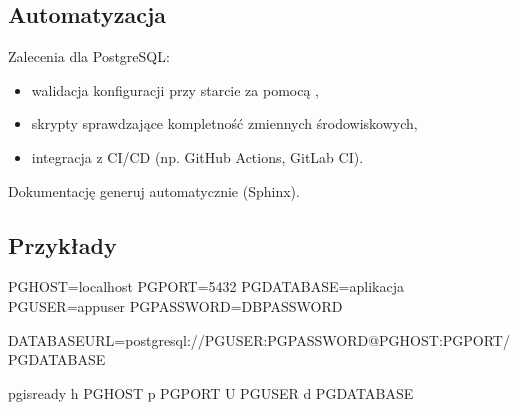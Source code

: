 \documentclass[a4paper,11pt,english,openany,oneside]{sphinxmanual}
\begin{document}
\subsection{Automatyzacja}
\label{\detokenize{rozdzial_2/rozdzial_22/index:automatyzacja}}
\sphinxAtStartPar
Zalecenia dla PostgreSQL:
\begin{itemize}
\item {} 
\sphinxAtStartPar
walidacja konfiguracji przy starcie za pomocą ,

\item {} 
\sphinxAtStartPar
skrypty sprawdzające kompletność zmiennych środowiskowych,

\item {} 
\sphinxAtStartPar
integracja z CI/CD (np. GitHub Actions, GitLab CI).

\end{itemize}

\sphinxAtStartPar
Dokumentację generuj automatycznie (Sphinx).


\subsection{Przykłady}
\label{\detokenize{rozdzial_2/rozdzial_22/index:przyklady}}
\sphinxAtStartPar
{}

\begin{sphinxVerbatim}[commandchars=\\\{\}]
PGHOST=localhost
PGPORT=5432
PGDATABASE=aplikacja
PGUSER=app\PYGZus{}user
PGPASSWORD=\PYGZdl{}\PYGZob{}DB\PYGZus{}PASSWORD\PYGZcb{}
\end{sphinxVerbatim}

\sphinxAtStartPar
{}

\begin{sphinxVerbatim}[commandchars=\\\{\}]
DATABASE\PYGZus{}URL=postgresql://\PYGZdl{}\PYGZob{}PGUSER\PYGZcb{}:\PYGZdl{}\PYGZob{}PGPASSWORD\PYGZcb{}@\PYGZdl{}\PYGZob{}PGHOST\PYGZcb{}:\PYGZdl{}\PYGZob{}PGPORT\PYGZcb{}/\PYGZdl{}\PYGZob{}PGDATABASE\PYGZcb{}
\end{sphinxVerbatim}

\sphinxAtStartPar
{}

\begin{sphinxVerbatim}[commandchars=\\\{\}]
pg\PYGZus{}isready \PYGZhy{}h \PYGZdl{}\PYGZob{}PGHOST\PYGZcb{} \PYGZhy{}p \PYGZdl{}\PYGZob{}PGPORT\PYGZcb{} \PYGZhy{}U \PYGZdl{}\PYGZob{}PGUSER\PYGZcb{} \PYGZhy{}d \PYGZdl{}\PYGZob{}PGDATABASE\PYGZcb{}
\end{sphinxVerbatim}
\end{document}
